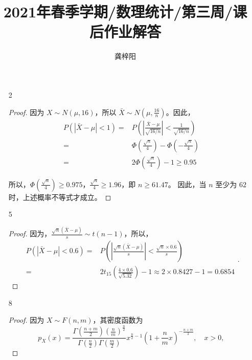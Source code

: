 \documentclass[normal,founder,mtpro2,cn]{elegantnote}
\title{2021年春季学期/数理统计/第三周/课后作业解答}
\author{龚梓阳}
\date{\zhtoday}
\begin{document}
\maketitle
\begin{enumerate}
    \item[2]
        \begin{proof}
            因为 $X\sim N(\mu,16)$，所以 $\bar{X}\sim N\left(\mu,\frac{16}{n}\right)$。因此，
            \begin{equation*}
                \begin{aligned}
                    P(|\bar{X}-\mu|<1)= & P\left(\left|\frac{\bar{X}-\mu}{\sqrt{16/n}}\right|<\frac{1}{\sqrt{16/n}}\right) \\
                    =                   & \Phi\left(\frac{\sqrt{n}}{4}\right)-\Phi\left(-\frac{\sqrt{n}}{4}\right)         \\
                    =                   & 2\Phi\left(\frac{\sqrt{n}}{4}\right)-1\geq0.95
                \end{aligned}
            \end{equation*}

            所以，$\Phi\left(\frac{\sqrt{n}}{4}\right)\geq0.975$，$\frac{\sqrt{n}}{4}\geq1.96$，即 $n\geq61.47$。
            因此，当 $n$ 至少为 $62$ 时，上述概率不等式才成立。
        \end{proof}
    \item[5]
        \begin{proof}
            因为，$\frac{\sqrt{n}(\bar{X}-\mu)}{s}\sim t(n-1)$，所以，
            \begin{equation*}
                \begin{aligned}
                    P(|\bar{X}-\mu|<0.6)= & P\left(\left|\frac{\sqrt{n}(\bar{X}-\mu)}{s}\right|<\frac{\sqrt{n}\times0.6}{s}\right) \\
                    =                     & 2t_{15}(\frac{4\times0.6}{\sqrt{5.32}})-1\approx2\times0.8427-1=0.6854
                \end{aligned}.
            \end{equation*}
        \end{proof}
    \item[8]
        \begin{proof}
            因为 $X\sim F(n,m)$，其密度函数为
            \begin{equation*}
                p_{X}(x)=\frac{\Gamma\left(\frac{n+m}{2}\right)\left(\frac{n}{m}\right)^{\frac{n}{2}}}{\Gamma\left(\frac{n}{2}\right)\Gamma\left(\frac{m}{2}\right)}x^{\frac{n}{2}-1}\left(1+\frac{n}{m}x\right)^{-\frac{n+m}{2}},\quad x>0,
            \end{equation*}


\end{proof}
\end{enumerate}
\end{document}
